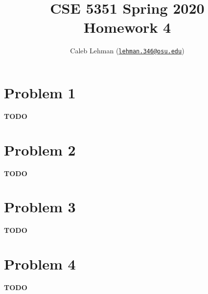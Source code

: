 \documentclass[12pt]{article}
\title{%
CSE 5351 Spring 2020\\
Homework 4
}
\author{%
Caleb Lehman
(\href{mailto:lehman.346@osu.edu}{\texttt{lehman.346@osu.edu}})
}
\date{%
}
\numberwithin{equation}{section}
\theoremstyle{plain}
\begin{document}
\maketitle

\section*{Problem 1}

\textbf{TODO}

\section*{Problem 2}

\textbf{TODO}

\section*{Problem 3}

\textbf{TODO}

\section*{Problem 4}

\textbf{TODO}
\end{document}
